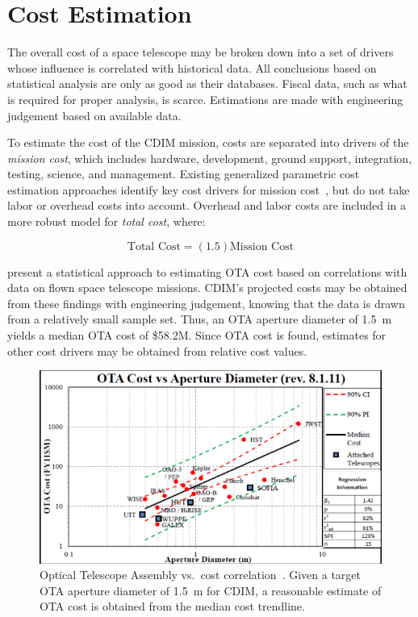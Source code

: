 \documentclass{ws-jai}
\begin{document}
\section{Cost Estimation}
\label{sec:cost}
The overall cost of a space telescope may be broken down into a set of drivers whose influence is correlated with historical data.
All conclusions based on statistical analysis are only as good as their databases.
Fiscal data, such as what is required for proper analysis, is scarce.
Estimations are made with engineering judgement based on available data.

To estimate the cost of the CDIM mission, costs are separated into drivers of the \emph{mission cost}, which includes hardware, development, ground support, integration, testing, science, and management.
Existing generalized parametric cost estimation approaches identify key cost drivers for mission cost~\cite{stahl2013,bely2011}, but do not take labor or overhead costs into account.
Overhead and labor costs are included in a more robust model for \emph{total cost}, where:

\begin{equation}
  	\text{Total Cost}=(1.5)\text{Mission Cost}
\label{eq:total-cost}
\end{equation}

\citeauthor{stahl2013} present a statistical approach to estimating OTA cost based on correlations with data on flown space telescope missions.
CDIM's projected costs may be obtained from these findings with engineering judgement, knowing that the data is drawn from a relatively small sample set.
Thus, an OTA aperture diameter of \SI{1.5}{\meter} yields a median OTA cost of \$58.2M.
Since OTA cost is found, estimates for other cost drivers may be obtained from relative cost values.

\begin{figure}
    \centering
    \includegraphics[width=.6\linewidth]{figs/ota_cost-diameter_stahl2010.png}
    \caption{Optical Telescope Assembly vs.\ cost correlation~\cite{stahl2013}. Given a target OTA aperture diameter of \SI{1.5}{\meter} for CDIM, a reasonable estimate of OTA cost is obtained from the median cost trendline.
\label{fig:cost-stahl-ota-cost-vs-diameter}
}
\end{figure}
\end{document}
